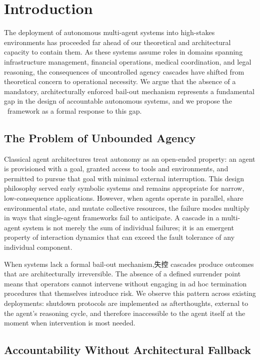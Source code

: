 \section{Introduction}

The deployment of autonomous multi-agent systems into high-stakes environments has proceeded far ahead of our theoretical and architectural capacity to contain them. As these systems assume roles in domains spanning infrastructure management, financial operations, medical coordination, and legal reasoning, the consequences of uncontrolled agency cascades have shifted from theoretical concern to operational necessity. We argue that the absence of a mandatory, architecturally enforced bail-out mechanism represents a fundamental gap in the design of accountable autonomous systems, and we propose the \bxthree\ framework as a formal response to this gap.

\subsection{The Problem of Unbounded Agency}

Classical agent architectures treat autonomy as an open-ended property: an agent is provisioned with a goal, granted access to tools and environments, and permitted to pursue that goal with minimal external interruption. This design philosophy served early symbolic systems and remains appropriate for narrow, low-consequence applications. However, when agents operate in parallel, share environmental state, and mutate collective resources, the failure modes multiply in ways that single-agent frameworks fail to anticipate. A cascade in a multi-agent system is not merely the sum of individual failures; it is an emergent property of interaction dynamics that can exceed the fault tolerance of any individual component.

When systems lack a formal bail-out mechanism,失控 cascades produce outcomes that are architecturally irreversible. The absence of a defined surrender point means that operators cannot intervene without engaging in ad hoc termination procedures that themselves introduce risk. We observe this pattern across existing deployments: shutdown protocols are implemented as afterthoughts, external to the agent's reasoning cycle, and therefore inaccessible to the agent itself at the moment when intervention is most needed.

\subsection{Accountability Without Architectural Fallback}


